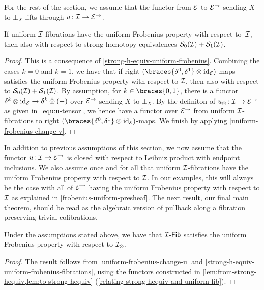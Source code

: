 \documentclass[reqno,10pt,a4paper,oneside,draft]{amsart}
\begin{document}
For the rest of the section, we assume that the functor from $\cal{E}$ to $\cal{E}^\to$ sending $X$ to $\bot_X$ lifts through $u \co \cal{I} \to \cal{E}^\to$.

\begin{proposition} \label{strong-h-equiv-uniform-frobenius-fibrations}
If uniform $\cal{I}$-fibrations have the uniform Frobenius property with respect to~$\cal{I}$, then also with respect to strong homotopy equivalences $\cal{S}_0(\cal{I}) + \cal{S}_1(\cal{I})$.
\end{proposition}

\begin{proof}
This is a consequence of \cref{strong-h-equiv-uniform-frobenius}.
Combining the cases $k = 0$ and $k = 1$, we have that if right $(\braces{\lcyl, \rcyl} \otimes \id_\catE)$-maps satisfies the uniform Frobenius property with respect to $\cal{I}$, then also with respect to $\cal{S}_0(\cal{I}) + \cal{S}_1(\cal{I})$.
By assumption, for $k \in \braces{0, 1}$, there is a functor $\delta^k \otimes \id_\catE \to \delta^k \hatotimes (-)$ over $\catE^\to$ sending $X$ to $\bot_X$.
By the definiton of $u_\otimes \co \cal{I} \to \catE^\to$ as given in~\eqref{equ:u-tensor}, we hence have a functor over $\catE^\to$ from uniform $\cal{I}$-fibrations to right $(\braces{\lcyl, \rcyl} \otimes \id_\catE)$-maps.
We finish by applying \cref{uniform-frobenius-change-v}.
\end{proof}

In addition to previous assumptions of this section, we now assume that the functor $u \co \cal{I} \to \catE^\to$ is closed with respect to Leibniz product with endpoint inclusions.
We also assume once and for all that uniform $\cal{I}$-fibrations have the uniform Frobenius property with respect to $\cal{I}$.
In our examples, this will always be the case with all of $\catE^\to$ having the uniform Frobenius property with respect to $\cal{I}$ as explained in \cref{frobenius-uniform-presheaf}.
The next result, our final main theorem, should be read as the algebraic version of pullback along a fibration preserving trivial cofibrations.

\begin{theorem} \label{uniform-fibrations-uniform-frobenius}
Under the assumptions stated above, we have that $\Fib{\cal{I}} $ satisfies the uniform Frobenius property with respect to $\cal{I}_{\otimes}$.
\end{theorem}

\begin{proof}
The result follows from \cref{uniform-frobenius-change-u} and \cref{strong-h-equiv-uniform-frobenius-fibrations}, using the functors constructed in \cref{lem:from-strong-hequiv,lem:to-strong-hequiv} (\cf \cref{relating-strong-hequiv-and-uniform-fib}).
\end{proof}
\end{document}
